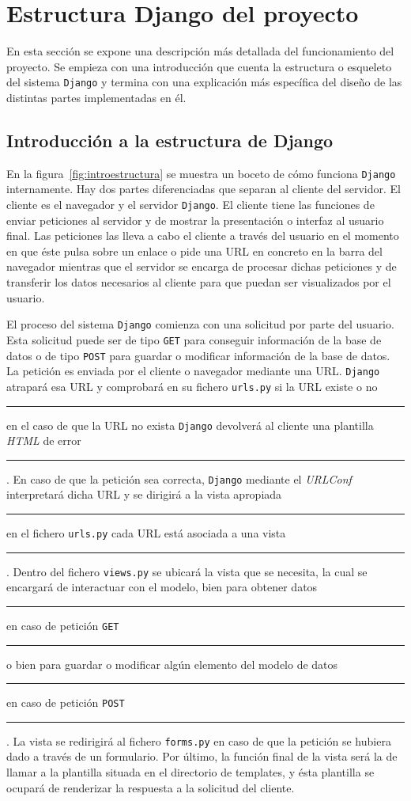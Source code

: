 \documentclass[a4paper, 12pt]{book}
\begin{document}
\section{Estructura Django del proyecto} 
\label{sec:estructuradjango}
En esta secci\'on se expone una descripci\'on m\'as detallada del funcionamiento del proyecto. Se empieza con una introducci\'on que cuenta la estructura
o esqueleto del sistema \texttt{Django} y termina con una explicaci\'on m\'as espec\'ifica del dise\~no de las distintas partes implementadas en \'el.


\subsection{Introducci\'on a la estructura de Django} 
\label{sec:introestructura}
En la figura~\ref{fig:introestructura} se muestra un boceto de c\'omo funciona \texttt{Django} internamente. Hay dos partes diferenciadas que separan al
cliente del servidor. El cliente es el navegador y el servidor \texttt{Django}. El cliente tiene las funciones de enviar peticiones al servidor y de 
mostrar la presentaci\'on o interfaz al usuario final. Las peticiones las lleva a cabo el cliente a trav\'es del usuario en el momento en que \'este 
pulsa sobre un enlace o pide una URL en concreto en la barra del navegador mientras que el servidor se encarga de procesar dichas peticiones y de 
transferir los datos necesarios al cliente para que puedan ser visualizados por el usuario.

El proceso del sistema \texttt{Django} comienza con una solicitud por parte del usuario. Esta solicitud puede ser de tipo \texttt{GET} para conseguir 
informaci\'on de la base de datos o de tipo \texttt{POST} para guardar o modificar informaci\'on de la base de datos. La petici\'on es enviada por el 
cliente o navegador mediante una URL. \texttt{Django} atrapar\'a esa URL y comprobar\'a en su fichero \texttt{urls.py} si la URL existe o no 
\rule[1mm]{4mm}{0.1mm}en el caso de que la URL no exista \texttt{Django} devolver\'a al cliente una plantilla \textit{HTML} de error\rule[1mm]{4mm}{0.1mm}.
En caso de que la petici\'on sea correcta, \texttt{Django} mediante el \textit{URLConf} interpretar\'a dicha URL y se dirigir\'a a la vista apropiada 
\rule[1mm]{4mm}{0.1mm}en el fichero \texttt{urls.py} cada URL est\'a asociada a una vista\rule[1mm]{4mm}{0.1mm}. Dentro del fichero \texttt{views.py} se
ubicar\'a la vista que se necesita, la cual se encargar\'a de interactuar con el modelo, bien para obtener datos \rule[1mm]{4mm}{0.1mm}en caso de 
petici\'on \texttt{GET}\rule[1mm]{4mm}{0.1mm} o bien para guardar o modificar alg\'un elemento del modelo de datos \rule[1mm]{4mm}{0.1mm}en caso de 
petici\'on \texttt{POST}\rule[1mm]{4mm}{0.1mm}. La vista se redirigir\'a al fichero \texttt{forms.py} en caso de que la petici\'on se hubiera dado a trav\'es
de un formulario. Por \'ultimo, la funci\'on final de la vista ser\'a la de llamar a la plantilla situada en el directorio de templates, y \'esta plantilla
se ocupar\'a de renderizar la respuesta a la solicitud del cliente.
\end{document}
